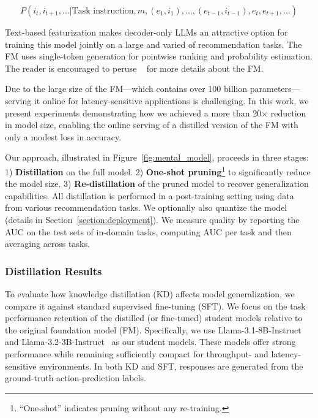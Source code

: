 \begin{equation}
    P(i_t, i_{t+1},... | \text{Task instruction}, m, (e_1, i_1),..., (e_{t-1}, i_{t-1}), e_t, e_{t+1},...)
\end{equation}


Text-based featurization makes decoder-only LLMs an attractive option for training this model jointly on a large and varied of recommendation tasks. The FM uses single-token generation for pointwise ranking and probability estimation. The reader is encouraged to peruse ~\cite{firooz2025360brew} for more details about the FM.

Due to the large size of the FM---which contains over 100 billion parameters---serving it online for latency-sensitive applications is challenging. In this work, we present experiments demonstrating how we achieved a more than 20$\times$ reduction in model size, enabling the online serving of a distilled version of the FM with only a modest loss in accuracy.


Our approach, illustrated in Figure~\ref{fig:mental_model}, proceeds in three stages: 1) \textbf{Distillation} on the full model. 2) \textbf{One-shot pruning}\footnote{``One-shot'' indicates pruning without any re-training.} to significantly reduce the model size. 3) \textbf{Re-distillation} of the pruned model to recover generalization capabilities.
All distillation is performed in a post-training setting using data from various recommendation tasks. We optionally also quantize the model (details in Section~\ref{section:deployment}). We measure quality by reporting the AUC on the test sets of in-domain tasks, computing AUC per task and then averaging across tasks.

\subsubsection{Distillation Results}

To evaluate how knowledge distillation (KD) affects model generalization, we compare it against standard supervised fine-tuning (SFT). We focus on the task performance retention of the distilled (or fine-tuned) student models relative to the original foundation model (FM). Specifically, we use Llama-3.1-8B-Instruct and Llama-3.2-3B-Instruct~\cite{dubey2024llama} as our student models. These models offer strong performance while remaining sufficiently compact for throughput- and latency-sensitive environments. In both KD and SFT, responses are generated from the ground-truth action-prediction labels.

